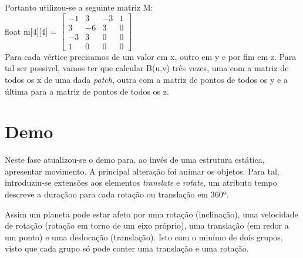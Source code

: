 Portanto utilizou-se a seguinte matriz M: \\
float m[4][4] = $\left[ \begin{array}{cccc}
	-1 & 3  & -3 & 1 \\ 
	3 & -6 & 3 & 0\\
	-3 & 3  & 0 &0\\
	1 & 0 & 0 & 0
	\end{array} \right]$
	\\

Para cada vértice precisamos de um valor em x, outro em y e por fim em z. Para tal ser possivel, vamos ter que calcular B(u,v) três vezes, uma com a matriz de todos os x de uma dada \textit{patch}, outra com a matriz de pontos de todos os y e a última para a matriz de pontos de todos os z.


\chapter{Demo}

Neste fase atualizou-se o demo para, ao invés de uma estrutura estática, apresentar movimento. A principal alteração foi animar os objetos. Para tal, introduziu-se extensões aos elementos \textit{translate} e \textit{rotate}, um atributo tempo descreve a duraçãoo para cada rotação ou translação em 360º. 



Assim um planeta pode estar afeto por uma rotação (inclinação), uma velocidade de rotação (rotação em torno de um eixo próprio), uma translação (em redor a um ponto) e uma deslocação (translação). Isto com o minímo
de dois grupos, visto que cada grupo só pode conter uma translação e uma rotação. 